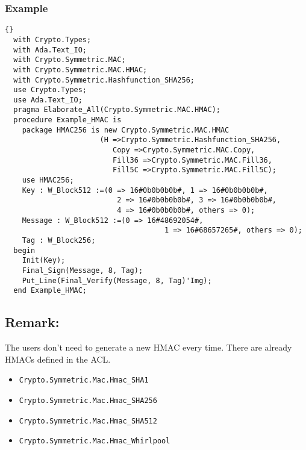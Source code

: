 \subsubsection*{Example}
\begin{lstlisting}{}
  with Crypto.Types;
  with Ada.Text_IO;
  with Crypto.Symmetric.MAC;
  with Crypto.Symmetric.MAC.HMAC;
  with Crypto.Symmetric.Hashfunction_SHA256;
  use Crypto.Types;
  use Ada.Text_IO;
  pragma Elaborate_All(Crypto.Symmetric.MAC.HMAC);
  procedure Example_HMAC is
    package HMAC256 is new Crypto.Symmetric.MAC.HMAC
				      (H =>Crypto.Symmetric.Hashfunction_SHA256,
		    		 	 Copy =>Crypto.Symmetric.MAC.Copy,
						 Fill36 =>Crypto.Symmetric.MAC.Fill36,
						 Fill5C =>Crypto.Symmetric.MAC.Fill5C);
    use HMAC256;
    Key : W_Block512 :=(0 => 16#0b0b0b0b#, 1 => 16#0b0b0b0b#,
		                  2 => 16#0b0b0b0b#, 3 => 16#0b0b0b0b#,
		                  4 => 16#0b0b0b0b#, others => 0);
    Message : W_Block512 :=(0 => 16#48692054#, 
    								 1 => 16#68657265#, others => 0);
    Tag : W_Block256;
  begin
    Init(Key);
    Final_Sign(Message, 8, Tag);
    Put_Line(Final_Verify(Message, 8, Tag)'Img);
  end Example_HMAC;
\end{lstlisting}
\subsection*{Remark:}
The users don't need to generate a new HMAC every time. There are already HMACs defined in the ACL.
\begin{itemize}
\item \texttt{Crypto.Symmetric.Mac.Hmac\_SHA1}
\item \texttt{Crypto.Symmetric.Mac.Hmac\_SHA256}
\item \texttt{Crypto.Symmetric.Mac.Hmac\_SHA512}
\item \texttt{Crypto.Symmetric.Mac.Hmac\_Whirlpool}
\end{itemize}
